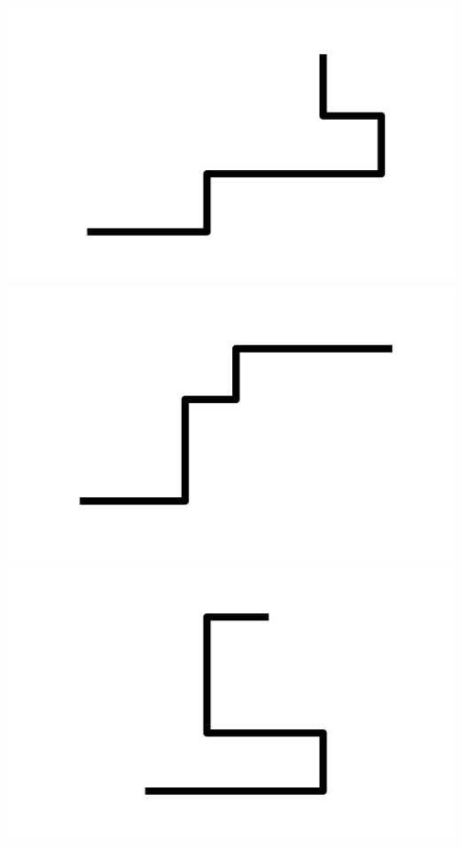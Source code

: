 \documentclass[]{report}
\begin{document}
\includegraphics[scale=.1]{pictures/21/state_cluster_shapes_280.pdf} 
\includegraphics[scale=.1]{pictures/21/state_cluster_shapes_281.pdf} 
\includegraphics[scale=.1]{pictures/21/state_cluster_shapes_282.pdf} 
\end{document}
